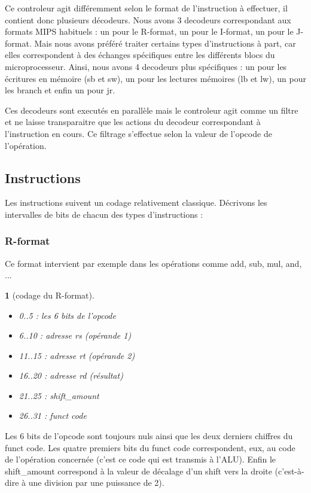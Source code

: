 \documentclass[13pt]{article}
\newtheorem{format}{  }
\begin{document}
Ce controleur agit différemment selon le format de l’instruction à effectuer,
il contient donc plusieurs décodeurs. Nous avons 3 decodeurs correspondant
aux formats MIPS habituels : un pour le R-format, un pour le I-format, 
un pour le J-format. Mais nous avons préféré traiter certains types d'instructions
à part, car elles correspondent à des échanges spécifiques entre les différents blocs 
du microprocesseur. Ainsi, nous avons 4 decodeurs plus spécifiques : un pour les écritures en 
mémoire (sb et sw), un pour les lectures mémoires (lb et lw), un pour les branch et enfin
un pour jr. 

Ces decodeurs sont executés en parallèle mais le controleur agit comme un filtre
et ne laisse transparaitre que les actions du decodeur correspondant à l'instruction en cours.
Ce filtrage s'effectue selon la valeur de l'opcode de l'opération.

\subsection{Instructions}

Les instructions suivent un codage relativement classique.
Décrivons les intervalles de bits de chacun des types d'instructions :


\subsubsection{R-format}

Ce format intervient par exemple dans les opérations 
comme add, sub, mul, and, ...

\begin{format}[codage du R-format]
  \begin{itemize}
  \item 0..5 : les 6 bits de l'opcode
  \item 6..10 : adresse rs (opérande 1)
  \item 11..15 : adresse rt (opérande 2)
  \item 16..20 : adresse rd (résultat)
  \item 21..25 : shift\_amount
  \item 26..31 : funct code
  \end{itemize}
\end{format}

Les 6 bits de l'opcode sont toujours nuls ainsi que les deux
derniers chiffres du funct code. Les quatre premiers bits du
funct code correspondent, eux, au code de l'opération concernée
(c'est ce code qui est transmis à l'ALU). Enfin le shift\_amount 
correspond à la valeur de décalage d'un shift vers la droite 
(c'est-à-dire à une division par une puissance de 2).
\end{document}
